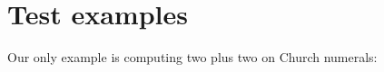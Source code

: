 \hypertarget{test-examples}{%
\section{Test examples}\label{test-examples}}

Our only example is computing two plus two on Church numerals:

\begin{fence}
\begin{code}%
\>[0]\AgdaSpace{}%
\AgdaSymbol{:}\AgdaSpace{}%
\AgdaSpace{}%
\AgdaSymbol{\{}\AgdaSymbol{\}}\AgdaSpace{}%
\AgdaSpace{}%
\AgdaSpace{}%
\AgdaSpace{}%
\<%
\\
\>[0]\AgdaSpace{}%
\AgdaSymbol{=}\AgdaSpace{}%
\AgdaSpace{}%
\AgdaSpace{}%
\AgdaSymbol{(}\AgdaOperator{\AgdaFunction{\#}}\AgdaSpace{}%
\AgdaSpace{}%
\AgdaSpace{}%
\AgdaSymbol{(}\AgdaOperator{\AgdaFunction{\#}}\AgdaSpace{}%
\AgdaSpace{}%
\AgdaSpace{}%
\AgdaOperator{\AgdaFunction{\#}}\AgdaSpace{}%
\AgdaSymbol{))}\<%
\\
%
\\[\AgdaEmptyExtraSkip]%
\>[0]\AgdaSpace{}%
\AgdaSymbol{:}\AgdaSpace{}%
\AgdaSpace{}%
\AgdaSymbol{\{}\AgdaSymbol{\}}\AgdaSpace{}%
\AgdaSpace{}%
\AgdaSpace{}%
\AgdaSpace{}%
\<%
\\
\>[0]\AgdaSpace{}%
\AgdaSymbol{=}\AgdaSpace{}%
\AgdaSpace{}%
\AgdaSpace{}%
\AgdaSymbol{(}\AgdaOperator{\AgdaFunction{\#}}\AgdaSpace{}%
\AgdaSpace{}%
\AgdaSpace{}%
\AgdaSymbol{(}\AgdaOperator{\AgdaFunction{\#}}\AgdaSpace{}%
\AgdaSpace{}%
\AgdaSpace{}%
\AgdaSymbol{(}\AgdaOperator{\AgdaFunction{\#}}\AgdaSpace{}%
\AgdaSpace{}%
\AgdaSpace{}%
\AgdaSymbol{(}\AgdaOperator{\AgdaFunction{\#}}\AgdaSpace{}%
\AgdaSpace{}%
\AgdaSpace{}%
\AgdaOperator{\AgdaFunction{\#}}\AgdaSpace{}%

\end{code}
\end{fence}
